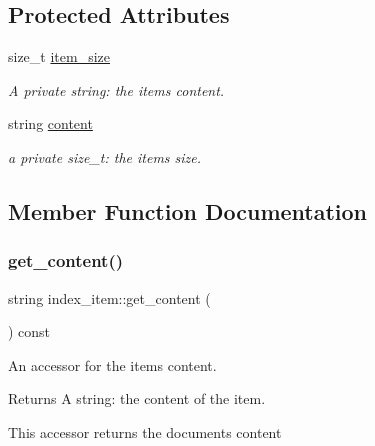 \subsection*{Protected Attributes}
\begin{DoxyCompactItemize}
\item 
\mbox{\label{classindex__item_a166149dcf6112a70a90c5d0a1742d935}} 
size\+\_\+t \hyperlink{classindex__item_a166149dcf6112a70a90c5d0a1742d935}{item\+\_\+size}
\begin{DoxyCompactList}\small\item\em A private string\+: the item\textquotesingle{}s content. \end{DoxyCompactList}\item 
\mbox{\label{classindex__item_a0bf501d53a26d87693da9ca8a038bfb7}} 
string \hyperlink{classindex__item_a0bf501d53a26d87693da9ca8a038bfb7}{content}
\begin{DoxyCompactList}\small\item\em a private size\+\_\+t\+: the item\textquotesingle{}s size. \end{DoxyCompactList}\end{DoxyCompactItemize}


\subsection{Member Function Documentation}
\mbox{\label{classindex__item_ae95390ac357a5e10b6c1335a49d91e83}} 
\subsubsection{\texorpdfstring{get\+\_\+content()}{get\_content()}}
{\footnotesize\ttfamily string index\+\_\+item\+::get\+\_\+content (\begin{DoxyParamCaption}{ }\end{DoxyParamCaption}) const}



An accessor for the item\textquotesingle{}s content. 

\begin{DoxyReturn}{Returns}
A string\+: the content of the item.
\end{DoxyReturn}
This accessor returns the document\textquotesingle{}s content \mbox{\label{classindex__item_a16fbb1fcb7c9296afd03eaed51175935}} 
